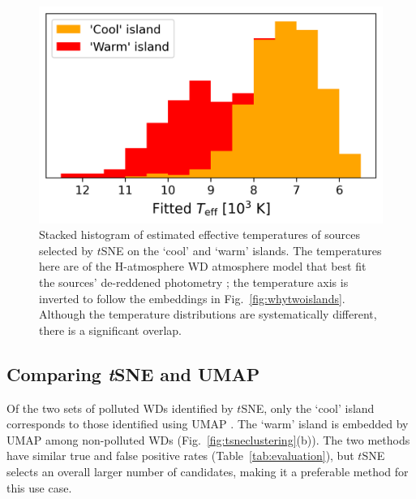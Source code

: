 \documentclass[fleqn,usenatbib]{rasti}
\begin{document}
\begin{figure}
\centering
\includegraphics[width=\columnwidth]{figures/fig9_clustercomparison.png}
\caption{
    Stacked histogram of estimated effective temperatures of sources selected by $t$SNE on the `cool' and `warm' islands.
    The temperatures here are of the H-atmosphere WD atmosphere model that best fit the sources' de-reddened photometry \citep{gentilefusillo21}; the temperature axis is inverted to follow the embeddings in Fig.~\ref{fig:whytwoislands}.
    Although the temperature distributions are systematically different, there is a significant overlap.
}
\label{fig:tempdistr}
\end{figure}



\subsection{Comparing \textit{t}SNE and UMAP}
\label{sec:tsnevumap}

Of the two sets of polluted WDs identified by $t$SNE, only the `cool' island corresponds to those identified using UMAP \citep[see also Fig.~\ref{fig:tsneclustering}]{kao24}.
The `warm' island is embedded by UMAP among non-polluted WDs (Fig.~\ref{fig:tsneclustering}(b)).
The two methods have similar true and false positive rates (Table~\ref{tab:evaluation}), but $t$SNE selects an overall larger number of candidates, making it a preferable method for this use case.
\end{document}
